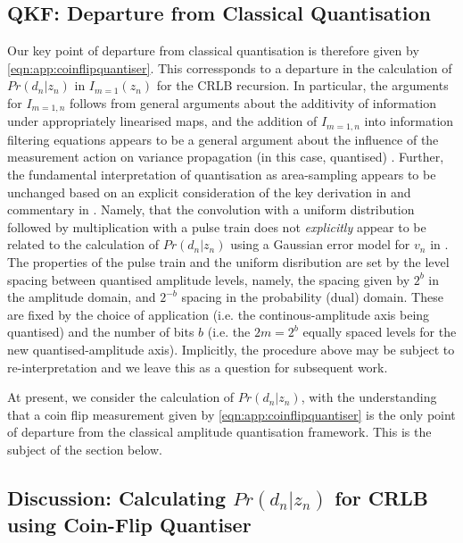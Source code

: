 \subsection{QKF: Departure from Classical Quantisation}

Our key point of departure from classical quantisation is therefore given by \cref{eqn:app:coinflipquantiser}. This corressponds to a departure in the calculation of $Pr(d_n | z_n)$ in $I_{m=1}(z_n)$ for the CRLB recursion. In particular, the arguments for $I_{m=1, n}$ follows from general arguments about the additivity of information under appropriately linearised maps, and the addition of $I_{m=1, n}$ into information filtering equations appears to be a general argument about the influence of the measurement action on variance propagation (in this case, quantised) \cite{karlsson2005}. Further, the fundamental interpretation of quantisation as area-sampling appears to be unchanged based on an explicit consideration of the key derivation in \cite{widrow1996} and commentary in \cite{karlsson2005}. Namely, that the convolution with a uniform distribution followed by multiplication with a pulse train does not \emph{explicitly} appear to be related to the calculation of  $Pr(d_n | z_n)$ using a Gaussian error model for $v_n$ in \cite{karlsson2005}. The properties of the pulse train and the uniform disribution are set by the level spacing between quantised amplitude levels, namely, the spacing given by $2^b$ in the amplitude domain, and $2^{-b}$ spacing in the probability (dual) domain. These are fixed by the choice of application (i.e. the continous-amplitude axis being quantised) and the number of bits $b$ (i.e. the $2m=2^b$ equally spaced levels for the new quantised-amplitude axis).  Implicitly, the procedure above may be subject to re-interpretation and we leave this as a question for subsequent work. 

At present, we consider the calculation of $Pr(d_n | z_n)$, with the understanding that  a coin flip measurement given by \cref{eqn:app:coinflipquantiser} is the only point of departure from the classical amplitude quantisation framework. This is the subject of the section below.

\subsection{Discussion: Calculating $Pr(d_n | z_n)$ for CRLB using Coin-Flip Quantiser}

